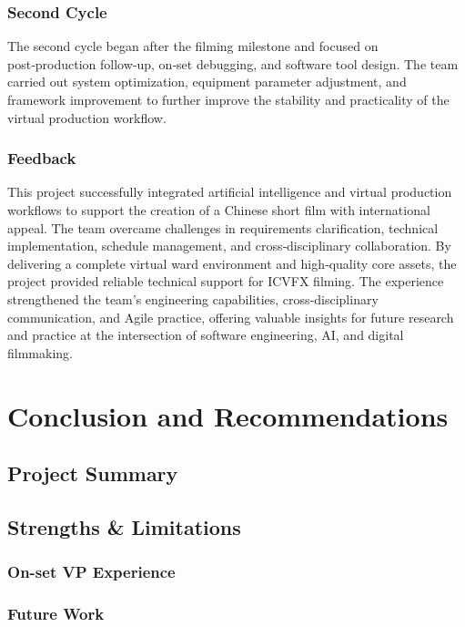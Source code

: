 \documentclass[12pt,a4paper]{report}
\begin{document}
\subsection{Second Cycle}
The second cycle began after the filming milestone and focused on post‑production follow‑up, on‑set debugging, and software tool design. The team carried out system optimization, equipment parameter adjustment, and framework improvement to further improve the stability and practicality of the virtual production workflow.

\subsection{Feedback}
This project successfully integrated artificial intelligence and virtual production workflows to support the creation of a Chinese short film with international appeal. The team overcame challenges in requirements clarification, technical implementation, schedule management, and cross‑disciplinary collaboration. By delivering a complete virtual ward environment and high‑quality core assets, the project provided reliable technical support for ICVFX filming. The experience strengthened the team’s engineering capabilities, cross‑disciplinary communication, and Agile practice, offering valuable insights for future research and practice at the intersection of software engineering, AI, and digital filmmaking.

\chapter{Conclusion and Recommendations}

\section{Project Summary}

\section{Strengths \& Limitations}

\subsection{On-set VP Experience}

\subsection{Future Work}
\end{document}
